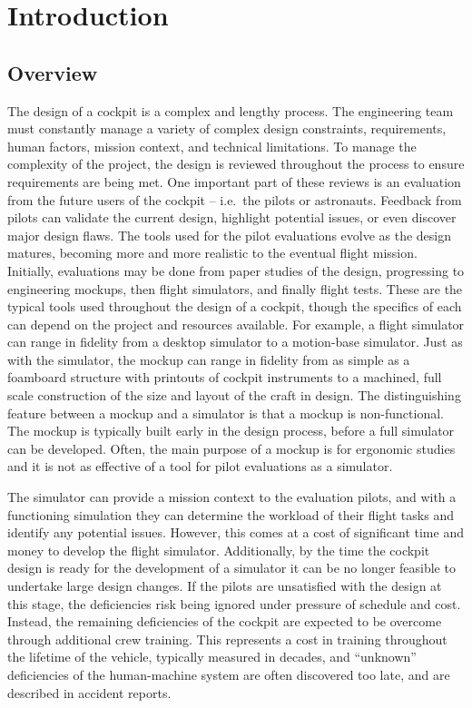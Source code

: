 \chapter{Introduction}


\section{Overview}
\label{overview}

The design of a cockpit is a complex and lengthy process.
The engineering team must constantly manage a variety of complex design constraints, requirements, human factors, mission context, and technical limitations.
To manage the complexity of the project, the design is reviewed throughout the process to ensure requirements are being met.
 One important part of these reviews is an evaluation from the future users of the cockpit -- i.e.\ the pilots or astronauts.
Feedback from pilots can validate the current design, highlight potential issues, or even discover major design flaws.
The tools used for the pilot evaluations evolve as the design matures, becoming more and more realistic to the eventual flight mission.
Initially, evaluations may be done from paper studies of the design, progressing to engineering mockups, then flight simulators, and finally flight tests.
These are the typical tools used throughout the design of a cockpit, though the specifics of each can depend on the project and resources available.
For example, a flight simulator can range in fidelity from a desktop simulator to a motion-base simulator.
Just as with the simulator, the mockup can range in fidelity from as simple as a foamboard structure with printouts of cockpit instruments to a machined, full scale construction of the size and layout of the craft in design.
The distinguishing feature between a mockup and a simulator is that a mockup is non-functional.
The mockup is typically built early in the design process, before a full simulator can be developed.
Often, the main purpose of a mockup is for ergonomic studies and it is not as effective of a tool for pilot evaluations as a simulator.

The simulator can provide a mission context to the evaluation pilots, and with a functioning simulation they can determine the workload of their flight tasks and identify any potential issues.
However, this comes at a cost of significant time and money to develop the flight simulator.
Additionally, by the time the cockpit design is ready for the development of a simulator it can be no longer feasible to undertake large design changes.
If the pilots are unsatisfied with the design at this stage, the deficiencies risk being ignored under pressure of schedule and cost.
Instead, the remaining deficiencies of the cockpit are expected to be overcome through additional crew training.
This represents a cost in training throughout the lifetime of the vehicle, typically measured in decades, and ``unknown'' deficiencies of the human-machine system are often discovered too late, and are described in accident reports.

